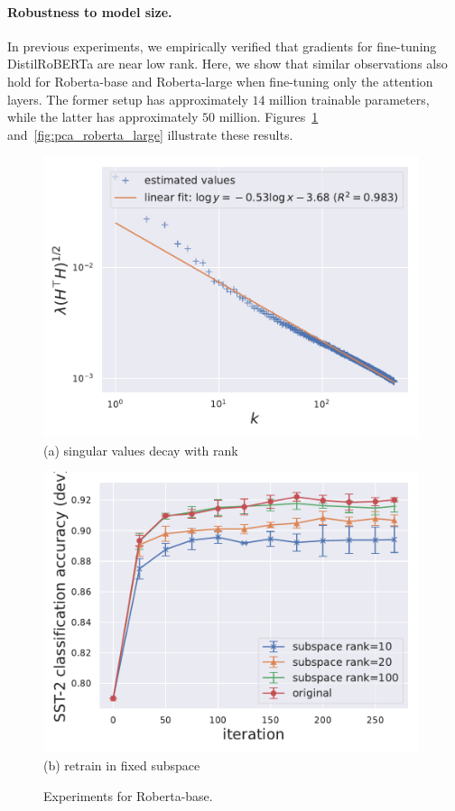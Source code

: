 \paragraph{Robustness to model size.}
In previous experiments, we empirically verified that gradients for fine-tuning DistilRoBERTa are near low rank.
Here, we show that similar observations also hold for Roberta-base and Roberta-large when fine-tuning only the attention layers.
The former setup has approximately $14$ million trainable parameters, while the latter has approximately $50$ million.
Figures~\ref{fig:pca_roberta_base} and~\ref{fig:pca_roberta_large} illustrate these results.

\begin{figure}[thb]
\begin{center}
\begin{minipage}[t]{0.45\linewidth}
\centering
{\includegraphics[width=0.98\textwidth]{figs/rebuttal/eigenvalue-linfit.pdf}}
\footnotesize{(a) singular values decay with rank}
\end{minipage}
\begin{minipage}[t]{0.45\linewidth}
\centering
{\includegraphics[width=0.98\textwidth]{figs/rebuttal/plot2.pdf}}
\footnotesize{(b) retrain in fixed subspace}
\end{minipage}
\end{center}
\caption{
Experiments for Roberta-base.
}
\label{fig:pca_roberta_base}
\end{figure}

